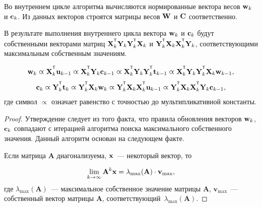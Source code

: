 Во внутреннем цикле алгоритма вычисляются нормированные вектора весов $\mathbf{w}_k$ и $\mathbf{c}_k$. 
Из данных векторов строятся матрицы весов $\mathbf{W}$ и $\mathbf{C}$ соответственно.

\begin{statement}
	В результате выполнения внутреннего цикла вектора $\mathbf{w}_k$ и $\mathbf{c}_k$ будут собственными векторами матриц $\bX_k^{\T} \bY_k \bY_k^{\T} \bX_k$ и $\bY_k^{\T} \bX_k \bX_k^{\T} \bY_k$, соответствующими максимальным собственным значениям.
	
	\begin{equation*}
		\bw_k \varpropto \bX_k^{\T} \bu_{k-1} \varpropto \bX_k^{\T} \bY_k \bc_{k-1} \varpropto \bX_k^{\T} \bY_k \bY_k^{\T} \bt_{k-1} \varpropto \bX_k^{\T} \bY_k \bY_k^{\T} \bX_k \bw_{k-1},
	\end{equation*}
	\begin{equation*}
		\bc_k \varpropto \bY_k^{\T} \bt_k \varpropto \bY_k^{\T} \bX_k \bw_k \varpropto \bY_k^{\T} \bX_k \bX_k^{\T} \bu_{k-1} \varpropto \bY_k^{\T} \bX_k \bX_k^{\T} \bY_k \bc_{k-1},
	\end{equation*}
	где символ $\varpropto$ означает равенство с точностью до мультипликативной константы. 
	\label{st:eig}
\end{statement}
\begin{proof}
	Утверждение следует из того факта, что правила обновления векторов $\mathbf{w}_k$, $\mathbf{c}_k$ совпадают с итерацией алгоритма поиска максимального собственного значения. 
	Данный алгоритм основан на следующем факте.
	
	Если матрица $\mathbf{A}$ диагонализуема, $\mathbf{x}$~--- некоторый вектор, то
	
	\[
	\lim_{k \rightarrow \infty} \mathbf{A}^k \mathbf{x} = \lambda_{\max}(\mathbf{A}) \cdot \mathbf{v}_{\max},
	\]
	где $ \lambda_{\max} (\mathbf{A})$~--- максимальное собственное значение матрицы $\mathbf{A}$, $\mathbf{v}_{\max}$~---собственный вектор матрицы $\mathbf{A}$, соответствующий~$\lambda_{\max} (\mathbf{A})$.
	
\end{proof}

